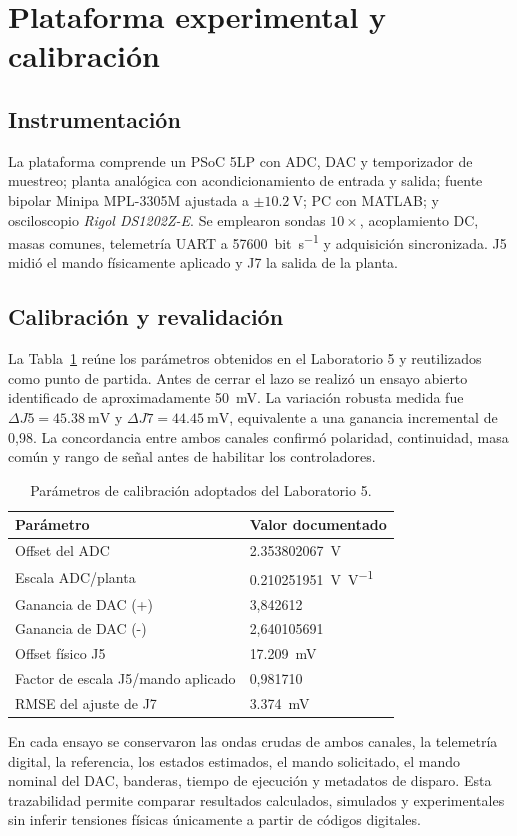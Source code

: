 \section{Plataforma experimental y calibración}
\subsection{Instrumentación}
La plataforma comprende un PSoC 5LP con ADC, DAC y temporizador de muestreo;
planta analógica con acondicionamiento de entrada y salida; fuente bipolar
Minipa MPL-3305M ajustada a $\pm\SI{10.2}{\volt}$; PC con MATLAB; y
osciloscopio \emph{Rigol DS1202Z-E}. Se emplearon sondas $10\times$,
acoplamiento DC, masas comunes, telemetría UART a
\SI{57600}{bit\per\second} y adquisición sincronizada. J5 midió el mando
físicamente aplicado y J7 la salida de la planta.

\subsection{Calibración y revalidación}
La Tabla~\ref{tab:calib_historica} reúne los parámetros obtenidos en el
Laboratorio 5 y reutilizados como punto de partida. Antes de cerrar el lazo se
realizó un ensayo abierto identificado de aproximadamente
\SI{50}{\milli\volt}. La variación robusta medida fue
$\Delta J5=\SI{45.38}{\milli\volt}$ y
$\Delta J7=\SI{44.45}{\milli\volt}$, equivalente a una ganancia incremental
de 0,98. La concordancia entre ambos canales confirmó polaridad, continuidad,
masa común y rango de señal antes de habilitar los controladores.

\begin{table}[t]
\centering
\caption{Parámetros de calibración adoptados del Laboratorio 5.}
\label{tab:calib_historica}
\small
\begin{tabular}{@{}ll@{}}
\toprule
Parámetro & Valor documentado \\
\midrule
Offset del ADC & \SI{2.353802067}{\volt} \\
Escala ADC/planta & \SI{0.210251951}{\volt\per\volt} \\
Ganancia de DAC (+) & 3,842612 \\
Ganancia de DAC (-) & 2,640105691 \\
Offset físico J5 & \SI{17.209}{\milli\volt} \\
Factor de escala J5/mando aplicado & 0,981710 \\
RMSE del ajuste de J7 & \SI{3.374}{\milli\volt} \\
\bottomrule
\end{tabular}
\end{table}

En cada ensayo se conservaron las ondas crudas de ambos canales, la telemetría
digital, la referencia, los estados estimados, el mando solicitado, el mando
nominal del DAC, banderas, tiempo de ejecución y metadatos de disparo. Esta
trazabilidad permite comparar resultados calculados, simulados y experimentales
sin inferir tensiones físicas únicamente a partir de códigos digitales.
